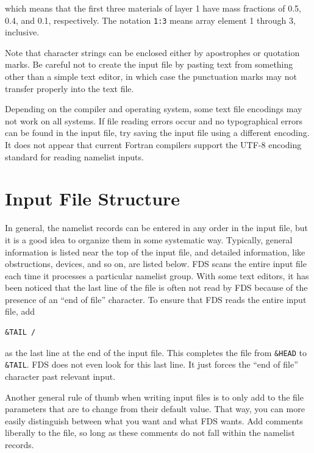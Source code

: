 \documentclass[11pt]{book}
\newcommand{\ct}{\tt\small}
\begin{document}
\noindent
which means that the first three materials of layer 1 have
mass fractions of 0.5, 0.4, and 0.1, respectively. The notation {\ct 1:3} means array element 1 through 3, inclusive.

Note that character strings can be enclosed either by apostrophes or quotation marks.
Be careful not to create the input file by pasting text from something other than a
simple text editor, in which case the punctuation marks may not transfer
properly into the text file.

Depending on the compiler and operating system, some text file encodings may not work on all systems.
If file reading errors occur and no typographical errors can be found in the input file, try saving the input file using a different encoding.
It does not appear that current Fortran compilers support the UTF-8 encoding standard for reading namelist inputs.



\section{Input File Structure}

In general, the namelist records can be entered in any order in the input file, but it is a good idea to organize them
in some systematic way. Typically, general information is listed near the top of the input file, and detailed information, like
obstructions, devices, and so on, are listed below. FDS scans the entire input file each time it processes a particular namelist group.
With some text editors, it has been noticed that the last line of the file is often not read by FDS because of the presence of an
``end of file'' character.
To ensure that FDS reads the entire input file, add

\footnotesize
\begin{verbatim}
&TAIL /
\end{verbatim}
\normalsize \noindent
as the last line at the end of the input file. This completes the file from {\ct \&HEAD} to {\ct \&TAIL}. FDS does not even look for
this last line. It just forces the ``end of file'' character past relevant input.

Another general rule of thumb when writing input files is to only add to the file parameters that are to change from their
default value. That way, you can more easily distinguish between what you want and what FDS wants.
Add comments liberally to the file, so long as
these comments do not fall within the namelist records.
\end{document}
